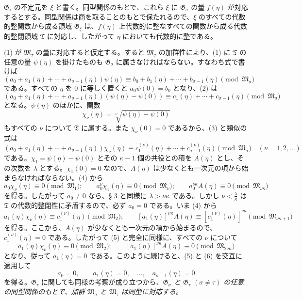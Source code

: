 \documentclass[11pt]{article}
\begin{document}
$\mathfrak G_\tau$ の不定元を $\xi$ と書く。同型関係のもとで、これら $\xi$ に $\mathfrak G_\sigma$ の量 $f(\eta)$ が対応するとする。同型関係は商を取ることのもとで保たれるので、$\xi$ のすべての代数的整関数から成る領域 $\mathfrak G_\xi$ は、$f(\eta)$ 上代数的に整なすべての関数から成る代数的整閉領域 $\mathfrak T$ に対応し、したがって $\eta$ においても代数的に整である。

(1) が $\mathfrak M_\tau$ の量に対応すると仮定する。すると $\mathfrak M_\tau$ の加群性により、(1) に $\mathfrak T$ の任意の量 $\psi(\eta)$ を掛けたものも $\mathfrak G_\sigma$ に属さなければならない。すなわち式で書けば
\begin{equation}
(a_0+a_1(\eta)+\cdots+a_{\sigma-1}(\eta))\psi(\eta)
\equiv b_0+b_1(\eta)+\cdots+b_{\sigma-1}(\eta)
\pmod{\mathfrak M_\sigma}
\tag{2}
\end{equation}
である。すべての $\eta$ を 0 に等しく置くと $a_0\psi(0)=b_0$ となり、(2) は
\begin{equation}
(a_0+a_1(\eta)+\cdots+a_{\sigma-1}(\eta))(\psi(\eta)-\psi(0))
\equiv c_1(\eta)+\cdots+c_{\sigma-1}(\eta)
\pmod{\mathfrak M_\sigma}
\tag{3}
\end{equation}
となる。$\psi(\eta)$ のほかに、関数
\[
 \chi_\nu(\eta)=\sqrt[\nu]{\psi(\eta)-\psi(0)}
\]
もすべての $\nu$ について $\mathfrak T$ に属する。また $\chi_\nu(0)=0$ であるから、(3) と類似の式は
\begin{equation}
(a_0+a_1(\eta)+\cdots+a_{\sigma-1}(\eta))\chi_\nu(\eta)
\equiv c_1^{(\nu)}(\eta)+\cdots+c_{\sigma-1}^{(\nu)}(\eta)
\pmod{\mathfrak M_\sigma}
\quad(\nu=1,2,\ldots)
\tag{4}
\end{equation}
である。$\chi_1=\psi(\eta)-\psi(0)$ とその $\kappa-1$ 個の共役との積を $A(\eta)$ とし、その次数を $\lambda$ とする。$\chi_1(0)=0$ なので、$A(\eta)$ は少なくとも一次元の項から始まらなければならない。(4) から
\begin{equation}
a_0\chi_\nu(\eta)\equiv0\pmod{\mathfrak M_1};\qquad
 a_0^\nu\chi_1(\eta)\equiv0\pmod{\mathfrak M_\nu};\qquad
 a_0^{\nu\kappa}A(\eta)\equiv0\pmod{\mathfrak M_{\nu\kappa}}
\tag{5}
\end{equation}
を得る。したがって $a_0\ne0$ なら、§ 3 と同様に $\lambda>\nu\kappa$ である。しかし $\nu<\frac{\lambda}{\kappa}$ は $\mathfrak T$ の代数的整閉性に矛盾するので、必ず $a_0=0$ である。いま (4) から
\begin{equation}
a_1(\eta)\chi_\nu(\eta)\equiv c_1^{(\nu)}(\eta)\pmod{\mathfrak M_2};\qquad
[a_1(\eta)]^{\nu\kappa}A(\eta)
\equiv[c_1^{(\nu)}(\eta)]^{\nu\kappa}\pmod{\mathfrak M_{\nu\kappa+1}}
\tag{6}
\end{equation}
を得る。ここから、$A(\eta)$ が少なくとも一次元の項から始まるので、$c_1^{(\nu)}(\eta)=0$ である。したがって (5) と完全に同様に、すべての $\nu$ について
\[
 a_1(\eta)\chi_\nu(\eta)\equiv0\pmod{\mathfrak M_2};\qquad
 [a_1(\eta)]^{\nu\kappa}A(\eta)\equiv0\pmod{\mathfrak M_{2\nu\kappa}}
\]
となり、従って $a_1(\eta)=0$ である。このように続けると、(5) と (6) を交互に適用して
\[
 a_0=0,\qquad a_1(\eta)=0,\quad \ldots,\quad a_{\sigma-1}(\eta)=0
\]
を得る。$\mathfrak G_\tau$ に関しても同様の考察が成り立つから、\emph{$\mathfrak G_\sigma$ と $\mathfrak G_\tau$ $(\sigma\ne\tau)$ の任意の同型関係のもとで、加群 $\mathfrak M_\sigma$ と $\mathfrak M_\tau$ は同型に対応する。}
\end{document}
